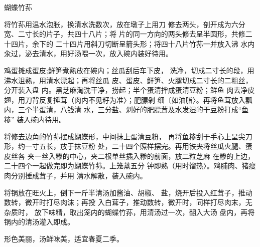 \begin{recipe}{蝴蝶竹荪}

\ingredients



\cooking

\step 	将竹荪用温水泡胀，换清水洗数次，放在墩子上用刀 修去两头，剖开成为六分宽、二寸长的片子，共四十八片；将 片的同一方向的两头修去呈半圆形，共修二十四片，余下的 二十四片用斜刀切断呈箭头形；将四十八片竹荪一并放入沸 水内汆过，泌去清水，用好汤喂一次，放入碗内装好待用。

\step 	鸡蛋摊成蛋皮;鲜笋煮熟放在碗内；丝瓜刮后车下皮， 洗净，切成二寸长的段，用沸水沮熟，用清水漂起；再将丝瓜 皮、蛋皮、鲜笋、火腿切成二寸长的二粗丝，分开装入盘 内。黑芝麻淘洗干净，捞起；半个蛋清拌成蛋清豆粉；鲜鱼 肉去净皮翅，用刀背反复捶茸（肉内不见籽为准〉；肥膘剁 细〔如油脂〉。再将鱼茸放入瓢内，三个半蛋清，八钱清 水，三分盐、剁好的肥膘茸及水发湿的干豆粉打成“鱼糁” 装入碗内待用。

\step 	将修去边角的竹荪摆成蝴蝶形，中间抹上蛋清豆粉， 再将鱼糁刮于手心上呈尖刀形，约一寸五长，放于抹豆粉 处，二十四个照样摆完。再用铁夹将丝瓜火腿、蛋皮丝各 夹一丝入糁的中心，夹二根单丝插入糁的前面，放二粒芝麻 在糁的上边，二十四个一起做完即为蝴蝶竹荪。上笼蒸五分 钟即熟（用时馏热〉。鸡脯肉、猪瘦肉分别捶成茸子，并用 清水解散，装入碗内。

\step 将锅放在旺火上，倒下一斤半清汤加酱油、胡椒、 盐，烧开后投入红茸子，推动数转，微开时打尽肉沫；再投 入白茸子，推动数转，微开时，同样打尽肉末，无杂质时， 放下味精，取出笼内的蝴蝶竹荪，用清汤过一次，翻入大汤 盘内，再将锅内的清汤灌入即成。

\notes

形色美丽，汤鲜味美，适宜春夏二季。

\end{recipe}

